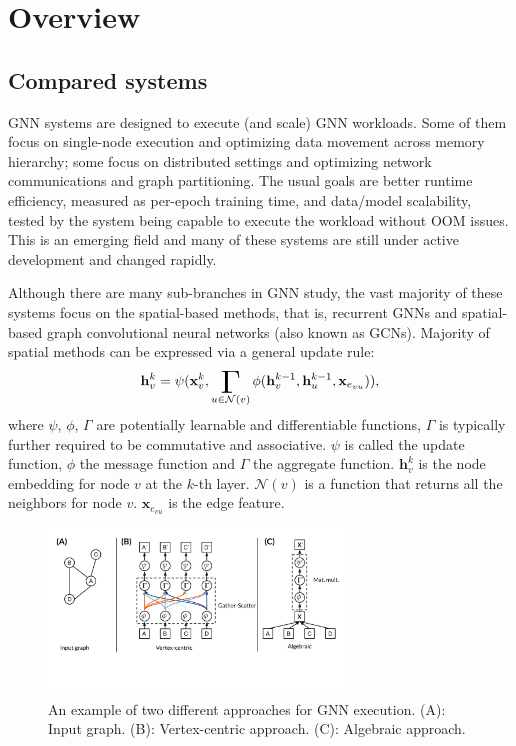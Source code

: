 

\section{Overview}
\subsection{Compared systems}
GNN systems are designed to execute (and scale) GNN workloads.  Some of them focus on single-node execution and optimizing data movement across memory hierarchy; some focus on distributed settings and optimizing network communications and graph partitioning. The usual goals are better runtime efficiency, measured as per-epoch training time, and data/model scalability, tested by the system being capable to execute the workload without OOM issues. This is an emerging field and many of these systems are still under active development and changed rapidly.

Although there are many sub-branches in GNN study, the vast majority of these systems focus on the spatial-based methods, that is, recurrent GNNs and spatial-based graph convolutional neural networks (also known as GCNs). Majority of spatial methods can be expressed via a general update rule:
\begin{gather}
\label{eq:mp}
\mathbf{h}_v ^k = \psi ( \mathbf{x}_v^k, \gammasum_{u \in {\mathcal {N}}(v)}  \phi(\mathbf{h}_v^{k-1}, \mathbf{h}_u^{k-1}, \mathbf{x}_{e_{vu}})),
\end{gather} 
where $\psi$, $\phi$, $\Gamma$ are potentially learnable and differentiable functions, $\Gamma$ is typically further required to be commutative and associative. $\psi$ is called the update function, $\phi$ the message function and $\Gamma$ the aggregate function. $\mathbf{h}_v^{k}$ is the node embedding for node $v$ at the $k$-th layer. $\mathcal {N}(v)$ is a function that returns all the neighbors for node $v$. $\mathbf{x}_{e_{vu}}$ is the edge feature.

\begin{figure}[t]
 \centering
\includegraphics[width=0.70\textwidth]{./images/gnnsys.pdf}
 \caption{An example of two different approaches for GNN execution. (A): Input graph. (B): Vertex-centric approach. (C): Algebraic approach.}
 \label{fig:gnnsys}
\end{figure}


